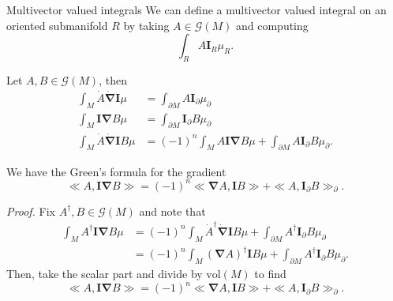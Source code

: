 \documentclass[aspectratio=169,handout]{beamer}
\newcommand{\grad}{\boldsymbol{\nabla}}
\newcommand{\G}{\mathcal{G}}
\newcommand{\blade}[1]{\boldsymbol{#1}}
\newcommand{\multivecinnerproduct}[2]{\ll #1, #2\gg}
\newcommand{\boundary}{{\partial M}}
\newcommand{\pseudoscalar}{\blade{I}}
\begin{document}
\begin{frame}{Multivector valued integrals}
\vfill
We can define a multivector valued integral on an oriented submanifold $R$ by taking $A\in \G(M)$ and computing
\[
\int_R A \pseudoscalar_R \mu_R.
\]
\vfill
\end{frame}

\begin{frame}{}
\vfill
\begin{theorem}
Let $A,B \in \G(M)$, then
\begin{align*}
\int_M \dot{A}\dot{\grad}\pseudoscalar \mu &= \int_\boundary A \pseudoscalar_\partial \mu_\partial\\
\int_M \pseudoscalar \grad B \mu &= \int_\boundary \pseudoscalar_\partial B\mu_\partial\\
\int_M \dot{A}\dot{\grad} \pseudoscalar B \mu &= (-1)^n \int_M A \pseudoscalar \grad B \mu + \int_\boundary A \pseudoscalar_\partial B \mu_\partial.
\end{align*}
\end{theorem}
\vfill
\end{frame}

\begin{frame}{}
\vfill
\begin{theorem}
We have the Green's formula for the gradient
\[
\multivecinnerproduct{A}{\pseudoscalar \grad B} = (-1)^n \multivecinnerproduct{\grad A}{\pseudoscalar B} + \multivecinnerproduct{A}{\pseudoscalar_\partial B}_\partial.
\]
\end{theorem}

\emph{Proof.} Fix $A^\dagger,B \in \G(M)$ and note that
\begin{align*}
    \int_M A^\dagger \pseudoscalar \grad B \mu &= (-1)^n \int_M \dot{A}^\dagger \dot{\grad} \pseudoscalar B \mu + \int_{\partial M} A^\dagger \pseudoscalar_\partial B \mu_\partial\\
    &=(-1)^n \int_M (\grad A)^\dagger \pseudoscalar B \mu + \int_{\partial M} A^\dagger \pseudoscalar_\partial B \mu_\partial.
\end{align*}
Then, take the scalar part and divide by $\textrm{vol}(M)$ to find
\[
\multivecinnerproduct{A}{\pseudoscalar \grad B} = (-1)^n \multivecinnerproduct{\grad A}{\pseudoscalar B} + \multivecinnerproduct{A}{\pseudoscalar_\partial B}_\partial.
\]
\vfill
\end{frame}
\end{document}
